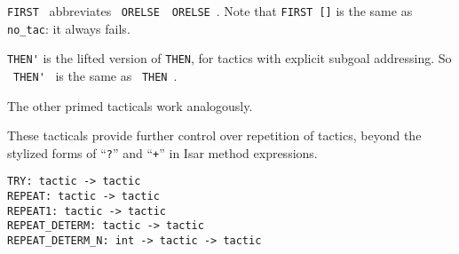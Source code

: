 \begin{isabellebody}
\begin{isamarkuptext}
\begin{description}
  \item \verb|FIRST|~ abbreviates ~\verb|ORELSE|~~\verb|ORELSE|~.  Note that \verb|FIRST []| is the same as \verb|no_tac|: it
  always fails.

  \item \verb|THEN'| is the lifted version of \verb|THEN|, for
  tactics with explicit subgoal addressing.  So ~\verb|THEN'|~ is the same as ~\verb|THEN|~.

  The other primed tacticals work analogously.

  \end{description}%
\end{isamarkuptext}%
\isamarkuptrue%
%
\endisatagmlref
{\isafoldmlref}%
%
\isadelimmlref
%
\endisadelimmlref
%
\isamarkuptrue%
%
\begin{isamarkuptext}%
These tacticals provide further control over repetition of
  tactics, beyond the stylized forms of ``\verb|?|''  and
  ``\verb|+|'' in Isar method expressions.%
\end{isamarkuptext}%
\isamarkuptrue%
%
\isadelimmlref
%
\endisadelimmlref
%
\isatagmlref
%
\begin{isamarkuptext}%
\begin{mldecls}
  \verb|TRY: tactic -> tactic| \\
  \verb|REPEAT: tactic -> tactic| \\
  \verb|REPEAT1: tactic -> tactic| \\
  \verb|REPEAT_DETERM: tactic -> tactic| \\
  \verb|REPEAT_DETERM_N: int -> tactic -> tactic| \\
  \end{mldecls}


\end{isamarkuptext}
\end{isabellebody}
